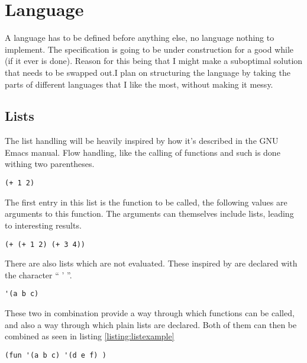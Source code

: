 \section{Language}


A language has to be defined before anything else, no language nothing to implement. 
The specification is going to be under construction for a good while (if it ever is done).
Reason for this being that I might make a suboptimal solution that needs to be swapped out.I plan on structuring the language by taking the parts of different languages that I like the most, without making it messy. 



\subsection{Lists}


The list handling will be heavily inspired by how it's described in the GNU Emacs manual\cite{fsf:22}. 
Flow handling, like the calling of functions and such is done withing two parentheses.

\begin{lstlisting}[caption=Example of how the function list looks]
(+ 1 2)
\end{lstlisting}

The first entry in this list is the function to be called, the following values are arguments to this function. 
The arguments can themselves include lists, leading to interesting results. 
\begin{lstlisting}[caption=Nesting of functions!]
(+ (+ 1 2) (+ 3 4))
\end{lstlisting}

There are also lists which are not evaluated. 
These inspired by \cite{fsf:22} are declared with the character `` ' ''.

\begin{lstlisting}[caption=Example of how a list with only plain values look]
'(a b c)
\end{lstlisting}

These two in combination provide a way through which functions can be called, and also a way through which plain lists are declared. 
Both of them can then be combined as seen in listing \ref{listing:listexample}

\begin{lstlisting}[caption=Function list with a pure list as one of the arguments,
	label=listing:listexample]
(fun '(a b c) '(d e f) )
\end{lstlisting}


